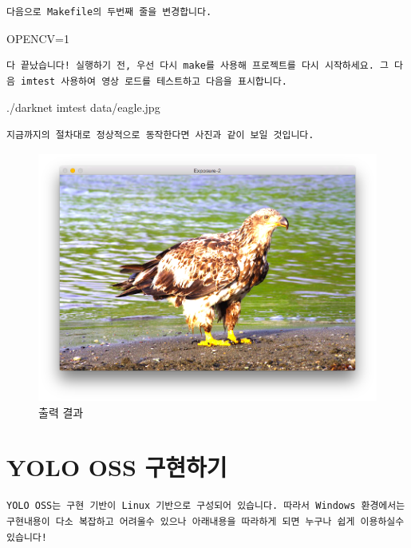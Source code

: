 \documentclass{article}
\begin{document}
\begin{verbatim}
다음으로 Makefile의 두번째 줄을 변경합니다.
\end{verbatim}
 OPENCV=1 
 
\begin{verbatim}
다 끝났습니다! 실행하기 전, 우선 다시 make를 사용해 프로젝트를 다시 시작하세요. 그 다음 imtest 사용하여 영상 로드를 테스트하고 다음을 표시합니다.
\end{verbatim}
 ./darknet imtest data/eagle.jpg 
 
 \begin{verbatim}
지금까지의 절차대로 정상적으로 동작한다면 사진과 같이 보일 것입니다.
\end{verbatim}
\begin{figure}[h!]
\centering
\includegraphics[scale=0.2]{egle.png}
\caption{출력 결과}
\label{fig:detect}
\end{figure}
 
  






\section{YOLO OSS 구현하기}

\author{Window 환경 }

\begin{verbatim}
YOLO OSS는 구현 기반이 Linux 기반으로 구성되어 있습니다. 따라서 Windows 환경에서는 구현내용이 다소 복잡하고 어려울수 있으나 아래내용을 따라하게 되면 누구나 쉽게 이용하실수 있습니다!

\end{verbatim}
\end{document}
